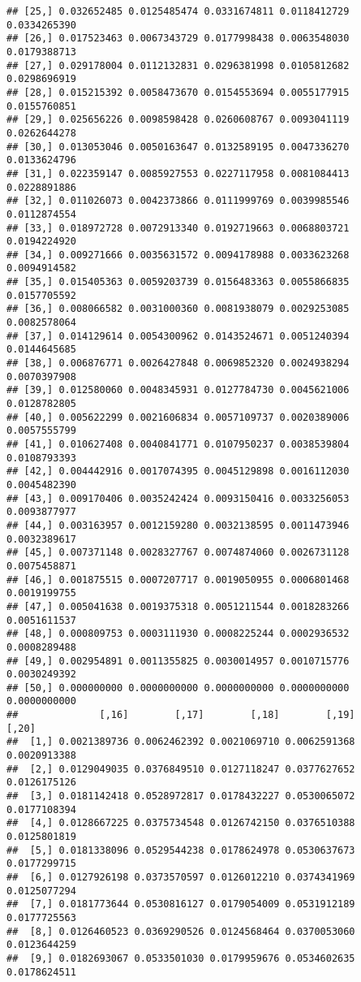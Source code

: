 \documentclass[]{article}
\begin{document}
\begin{verbatim}
## [25,] 0.032652485 0.0125485474 0.0331674811 0.0118412729 0.0334265390
## [26,] 0.017523463 0.0067343729 0.0177998438 0.0063548030 0.0179388713
## [27,] 0.029178004 0.0112132831 0.0296381998 0.0105812682 0.0298696919
## [28,] 0.015215392 0.0058473670 0.0154553694 0.0055177915 0.0155760851
## [29,] 0.025656226 0.0098598428 0.0260608767 0.0093041119 0.0262644278
## [30,] 0.013053046 0.0050163647 0.0132589195 0.0047336270 0.0133624796
## [31,] 0.022359147 0.0085927553 0.0227117958 0.0081084413 0.0228891886
## [32,] 0.011026073 0.0042373866 0.0111999769 0.0039985546 0.0112874554
## [33,] 0.018972728 0.0072913340 0.0192719663 0.0068803721 0.0194224920
## [34,] 0.009271666 0.0035631572 0.0094178988 0.0033623268 0.0094914582
## [35,] 0.015405363 0.0059203739 0.0156483363 0.0055866835 0.0157705592
## [36,] 0.008066582 0.0031000360 0.0081938079 0.0029253085 0.0082578064
## [37,] 0.014129614 0.0054300962 0.0143524671 0.0051240394 0.0144645685
## [38,] 0.006876771 0.0026427848 0.0069852320 0.0024938294 0.0070397908
## [39,] 0.012580060 0.0048345931 0.0127784730 0.0045621006 0.0128782805
## [40,] 0.005622299 0.0021606834 0.0057109737 0.0020389006 0.0057555799
## [41,] 0.010627408 0.0040841771 0.0107950237 0.0038539804 0.0108793393
## [42,] 0.004442916 0.0017074395 0.0045129898 0.0016112030 0.0045482390
## [43,] 0.009170406 0.0035242424 0.0093150416 0.0033256053 0.0093877977
## [44,] 0.003163957 0.0012159280 0.0032138595 0.0011473946 0.0032389617
## [45,] 0.007371148 0.0028327767 0.0074874060 0.0026731128 0.0075458871
## [46,] 0.001875515 0.0007207717 0.0019050955 0.0006801468 0.0019199755
## [47,] 0.005041638 0.0019375318 0.0051211544 0.0018283266 0.0051611537
## [48,] 0.000809753 0.0003111930 0.0008225244 0.0002936532 0.0008289488
## [49,] 0.002954891 0.0011355825 0.0030014957 0.0010715776 0.0030249392
## [50,] 0.000000000 0.0000000000 0.0000000000 0.0000000000 0.0000000000
##              [,16]        [,17]        [,18]        [,19]        [,20]
##  [1,] 0.0021389736 0.0062462392 0.0021069710 0.0062591368 0.0020913388
##  [2,] 0.0129049035 0.0376849510 0.0127118247 0.0377627652 0.0126175126
##  [3,] 0.0181142418 0.0528972817 0.0178432227 0.0530065072 0.0177108394
##  [4,] 0.0128667225 0.0375734548 0.0126742150 0.0376510388 0.0125801819
##  [5,] 0.0181338096 0.0529544238 0.0178624978 0.0530637673 0.0177299715
##  [6,] 0.0127926198 0.0373570597 0.0126012210 0.0374341969 0.0125077294
##  [7,] 0.0181773644 0.0530816127 0.0179054009 0.0531912189 0.0177725563
##  [8,] 0.0126460523 0.0369290526 0.0124568464 0.0370053060 0.0123644259
##  [9,] 0.0182693067 0.0533501030 0.0179959676 0.0534602635 0.0178624511

\end{verbatim}
\end{document}
